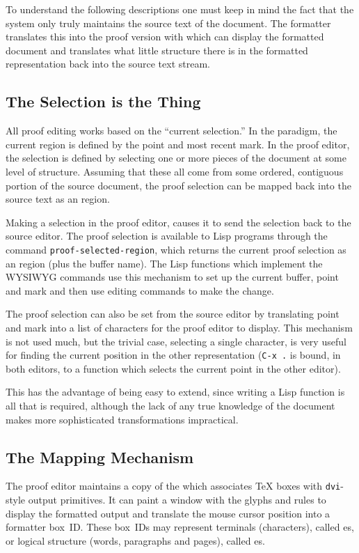 To understand the following descriptions one must keep in mind the fact
that the system only truly maintains the source text of the document.
The formatter translates this into the proof version with which {\VorTeX}
can display the formatted document and translates what little structure
there is in the formatted representation back into the source text stream.

\subsection{The Selection is the Thing}

All proof editing works based on the ``current selection.''  In the
{\EMACS} paradigm, the current region is defined by the point and most
recent mark.  In the proof editor, the selection is defined by selecting
one or more pieces of the document at some level of structure.  Assuming
that these all come from some ordered, contiguous portion of the source
document, the proof selection can be mapped back into the source text
as an {\EMACS} region.

Making a selection in the proof editor, causes it to send the selection
back to the source editor.  The proof selection is available to Lisp
programs through the command {\tt proof-selected-region}, which returns
the current proof selection as an {\EMACS} region (plus the buffer name).
The Lisp functions which implement the WYSIWYG commands use this mechanism
to set up the current buffer, point and mark and then use {\EMACS}
editing commands to make the change.

The proof selection can also be set from the source editor by translating
point and mark into a list of characters for the proof editor to display.
This mechanism is not used much, but the trivial case, selecting a single
character, is very useful for finding the current position in the other
representation ({\tt C-x .} is bound, in both editors, to a function
which selects the current point in the other editor).

This has the advantage of being easy to extend, since writing a Lisp
function is all that is required, although the lack of any true
knowledge of the document makes more sophisticated transformations
impractical.

\subsection{The Mapping Mechanism}

The proof editor maintains a copy of the {\IRT} which associates {\TeX}
boxes with {\tt dvi}-style output primitives.  It can paint a window with
the glyphs and rules to display the formatted output and translate the
mouse cursor position into a formatter box~ID.  These {\IRI} box~IDs
may represent terminals (characters), called \tbox es, or logical
structure (words, paragraphs and pages), called \nbox es.

